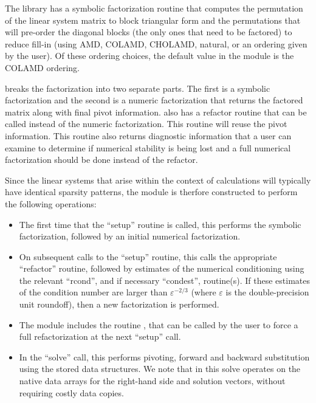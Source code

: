 The {\klu} library has a symbolic factorization routine that computes
the permutation of the linear system matrix to block triangular form
and the permutations that will pre-order the diagonal blocks (the only
ones that need to be factored) to reduce fill-in (using AMD, COLAMD,
CHOLAMD, natural, or an ordering given by the user).  Of these
ordering choices, the default value in the {\sunlinsolklu} 
module is the COLAMD ordering.

{\klu} breaks the factorization into two separate parts.  The first is
a symbolic factorization and the second is a numeric factorization
that returns the factored matrix along with final pivot information.   
{\klu} also has a refactor routine that can be called instead of the numeric 
factorization.  This routine will reuse the pivot information.  This routine 
also returns diagnostic information that a user can examine to determine if 
numerical stability is being lost and a full numerical factorization should 
be done instead of the refactor.

Since the linear systems that arise within the context of {\sundials}
calculations will typically have identical sparsity patterns, the
{\sunlinsolklu} module is therfore constructed to perform the
following operations:
\begin{itemize}
\item The first time that the ``setup'' routine is called, this
  performs the symbolic factorization, followed by an initial
  numerical factorization.  
\item On subsequent calls to the ``setup'' routine, this calls the
  appropriate {\klu} ``refactor'' routine, followed by estimates of
  the numerical conditioning using the relevant ``rcond'', and if
  necessary ``condest'', routine(s).  If these estimates of the
  condition number are larger than $\varepsilon^{-2/3}$ (where
  $\varepsilon$ is the double-precision unit roundoff), then a new
  factorization is performed.
\item The module includes the routine , that 
  can be called by the user to force a full refactorization at the
  next ``setup'' call. 
\item In the ``solve'' call, this performs pivoting, forward and
  backward substitution using the stored {\klu} data structures.  We
  note that in this solve {\klu} operates on the native data arrays
  for the right-hand side and solution vectors, without requiring
  costly data copies.
\end{itemize}


